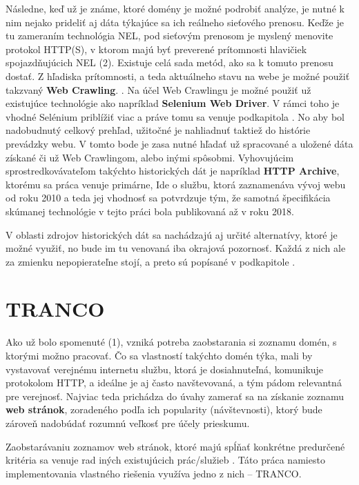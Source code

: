 Následne, keď už je známe, ktoré domény je možné podrobiť analýze, je nutné k nim nejako prideliť aj dáta týkajúce sa ich reálneho
sieťového prenosu. Keďže je tu zameraním technológia NEL, pod sieťovým prenosom je myslený menovite protokol HTTP(S), v ktorom
majú byť preverené prítomnosti hlavičiek spojazdňujúcich NEL (2). Existuje 
celá sada metód, ako sa k tomuto prenosu dostať. Z hľadiska prítomnosti, a teda aktuálneho stavu na webe je možné použiť 
takzvaný \textbf{Web Crawling}. . Na účel Web Crawlingu je možné použiť už existujúce technológie 
ako napríklad \textbf{Selenium Web Driver}. V rámci toho je vhodné Selénium priblížiť viac a práve tomu sa venuje podkapitola .
No aby bol nadobudnutý celkový prehľad, užitočné je nahliadnuť taktiež do histórie prevádzky webu. V tomto bode je zasa nutné hľadať už
spracované a uložené dáta získané či už Web Crawlingom, alebo inými spôsobmi. Vyhovujúcim sprostredkovávateľom takýchto historických dát
je napríklad \textbf{HTTP Archive}, ktorému sa práca venuje primárne, Ide o službu, ktorá zaznamenáva vývoj webu od roku 2010 a teda
jej vhodnosť sa potvrdzuje tým, že samotná špecifikácia skúmanej technológie v tejto práci bola publikovaná až v roku 2018.

V oblasti zdrojov historických dát sa nachádzajú aj určité alternatívy, ktoré je možné využiť, no bude im tu venovaná iba okrajová
pozornosť. Každá z nich ale za zmienku nepopierateľne stojí, a preto sú popísané v podkapitole .


\section{TRANCO}

Ako už bolo spomenuté (1), vzniká potreba zaobstarania si zoznamu domén, s ktorými možno pracovať. Čo sa vlastností takýchto domén týka,
mali by vystavovať verejnému internetu službu, ktorá je dosiahnuteľná, komunikuje protokolom HTTP, a ideálne je aj často navštevovaná,
a tým pádom relevantná pre verejnosť. Najviac teda prichádza do úvahy zamerať sa na získanie zoznamu \textbf{web stránok}, zoradeného podľa
ich popularity (návštevnosti), ktorý bude zároveň nadobúdať rozumnú veľkosť pre účely prieskumu. 

Zaobstarávaniu zoznamov web stránok, ktoré majú spĺňať konkrétne predurčené kritéria sa venuje rad iných existujúcich prác/služieb 
\cite{tranco}\cite{hacker-target-website-lists-overview}. Táto práca namiesto implementovania vlastného riešenia využíva jedno z nich -- TRANCO.

